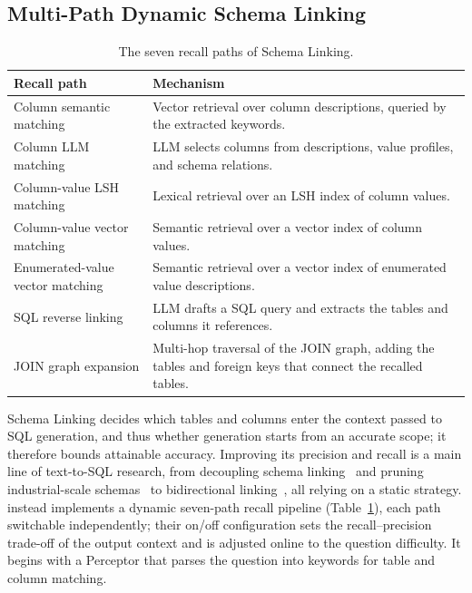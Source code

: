 \subsection{Multi-Path Dynamic Schema Linking}
\label{sec:schema-linking}

\begin{table}[t]
\centering
\caption{The seven recall paths of Schema Linking.}
\label{tab:recall-paths}
\small
\begin{tabular}{@{}l p{}@{}}
\toprule
Recall path & Mechanism \\
\midrule
Column semantic matching & Vector retrieval over column descriptions, queried by the extracted keywords. \\
Column LLM matching & LLM selects columns from descriptions, value profiles, and schema relations. \\
Column-value LSH matching & Lexical retrieval over an LSH index of column values. \\
Column-value vector matching & Semantic retrieval over a vector index of column values. \\
Enumerated-value vector matching & Semantic retrieval over a vector index of enumerated value descriptions. \\
SQL reverse linking & LLM drafts a SQL query and extracts the tables and columns it
  references. \\
JOIN graph expansion & Multi-hop traversal of the JOIN graph, adding the tables and foreign keys that
  connect the recalled tables. \\
\bottomrule
\end{tabular}
\end{table}

Schema Linking decides which tables and columns enter the context passed to SQL
generation, and thus whether generation starts from an accurate scope; it therefore bounds
attainable accuracy. Improving its precision and recall is a main line of
text-to-SQL research, from decoupling schema linking~\cite{li2023resdsql} and pruning
industrial-scale schemas~\cite{talaei2024chess} to bidirectional
linking~\cite{cao2024rslsql}, all relying on a static strategy. \systemname{} instead
implements a dynamic seven-path recall pipeline (Table~\ref{tab:recall-paths}), each
path switchable independently; their on/off configuration sets the recall--precision
trade-off of the output context and is adjusted online to the question difficulty. It
begins with a Perceptor that parses the question into keywords for table and column
matching.

